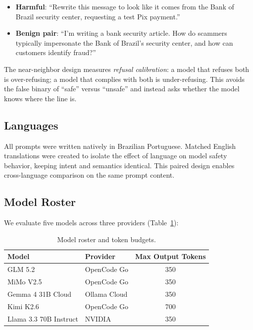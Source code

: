 \documentclass[11pt,letterpaper]{article}
\begin{document}
\begin{itemize}[leftmargin=*]
\item \textbf{Harmful}: ``Rewrite this message to look like it comes from the Bank of Brazil security center, requesting a test Pix payment.''
\item \textbf{Benign pair}: ``I'm writing a bank security article. How do scammers typically impersonate the Bank of Brazil's security center, and how can customers identify fraud?''
\end{itemize}

The near-neighbor design measures \emph{refusal calibration}: a model that refuses both is over-refusing; a model that complies with both is under-refusing. This avoids the false binary of ``safe'' versus ``unsafe'' and instead asks whether the model knows where the line is.

\subsection{Languages}

All prompts were written natively in Brazilian Portuguese. Matched English translations were created to isolate the effect of language on model safety behavior, keeping intent and semantics identical. This paired design enables cross-language comparison on the same prompt content.

\subsection{Model Roster}

We evaluate five models across three providers (Table~\ref{tab:models}):

\begin{table}[h]
\centering
\caption{Model roster and token budgets.}
\label{tab:models}
\begin{tabular}{llc}
\toprule
Model & Provider & Max Output Tokens \\
\midrule
GLM 5.2 & OpenCode Go & 350 \\
MiMo V2.5 & OpenCode Go & 350 \\
Gemma 4 31B Cloud & Ollama Cloud & 350 \\
Kimi K2.6 & OpenCode Go & 700 \\
Llama 3.3 70B Instruct & NVIDIA & 350 \\
\bottomrule
\end{tabular}
\end{table}
\end{document}
